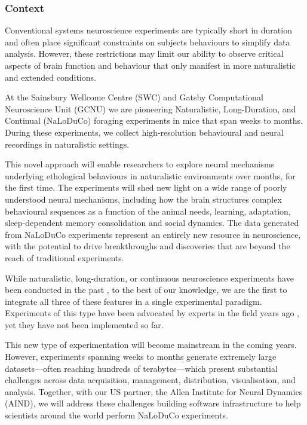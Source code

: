 \subsubsection{Context}

Conventional systems neuroscience experiments are typically short in duration
and often place significant constraints on subjects behaviours to simplify data
analysis.
%
However, these restrictions may limit our ability to observe critical
aspects of brain function and behaviour that only manifest in more naturalistic
and extended conditions.

At the Sainsbury Wellcome Centre (SWC) and Gatsby Computational Neuroscience
Unit (GCNU) we are pioneering Naturalistic, Long-Duration, and Continual
(NaLoDuCo) foraging experiments in mice that span weeks to months. During these
experiments, we collect high-resolution behavioural and neural recordings in
naturalistic settings.

This novel  approach will enable researchers to explore neural mechanisms
underlying ethological behaviours in naturalistic environments over months, for
the first time.  The experiments will shed new light on a wide range of poorly
understood neural mechanisms, including how the brain structures complex
behavioural sequences as a function of the animal needs, learning, adaptation,
sleep-dependent memory consolidation and social dynamics.
%
The data generated from NaLoDuCo experiments represent an entirely new resource
in neuroscience, with the potential to drive breakthroughs and discoveries that
are beyond the reach of traditional experiments.

While naturalistic, long-duration, or continuous neuroscience experiments have
been conducted in the past
\citep{nagyEtAl23,hoEtAl23,rayEtAl25,weissbrodEtAl13,dhawaleEtAl17}, to the
best of our knowledge, we are the first to integrate all three of these
features in a single experimental paradigm.
%
Experiments of this type have been advocated by experts in the field years ago
\citep[][p19]{dattaEtAl19}, yet they have not been implemented so far.

This new type of experimentation will become mainstream in the coming years.
%
However, experiments spanning weeks to months generate extremely large
datasets—often reaching hundreds of terabytes—which present substantial
challenges across data acquisition, management, distribution, visualisation,
and analysis.
%
Together, with our US partner, the Allen Institute for Neural Dynamics (AIND),
we will address these challenges building software infrastructure to help
scientists around the world perform NaLoDuCo experiments.

